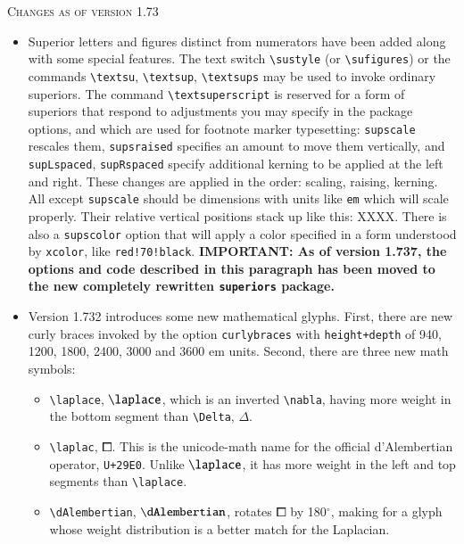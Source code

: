 \documentclass[\fsc]{article}
\theoremstyle{oldplain}
\theoremstyle{plain}
\begin{document}
\textsc{Changes as of version 1.73}
\begin{itemize}
\item
Superior letters and figures distinct from numerators have been added along with some special features. The text switch \verb|\sustyle| (or \verb|\sufigures|) or the commands \verb|\textsu|, \verb|\textsup|, \verb|\textsups| may be used to invoke ordinary superiors. 
The command \verb|\textsuperscript| is reserved for a form of superiors that respond to adjustments you may specify in the package options, and which are used for footnote marker typesetting: \verb|supscale| rescales them, \verb|supsraised| specifies an amount to move them vertically, and \verb|supLspaced|, \verb|supRspaced| specify additional kerning to be applied at the left and right. These changes are applied in the order: scaling, raising, kerning.  All except \verb|supscale| should be dimensions with units like {\tt em} which will scale properly. Their relative vertical positions stack up like this: XXXX.
 There is also a {\tt supscolor} option that will apply a color specified in a form understood by {\tt xcolor}, like {\tt red!70!black}. \textbf{IMPORTANT: As of version 1.737, the options and code described in this paragraph has been moved to the new completely rewritten  {\tt superiors} package.}
\item 
Version 1.732 introduces some new mathematical glyphs. First,  there are new curly braces invoked by the option {\tt curlybraces} with {\tt height+depth} of 940, 1200, 1800, 2400, 3000 and 3600 em units. Second, there are three new math symbols:
\begin{itemize}
\item
\verb|\laplace|, $\laplace$, which is an inverted \verb|\nabla|, having more weight in the  bottom segment than \verb|\Delta|, $\Delta$.
\item
\verb|\laplac|, $\laplac$. This is the unicode-math name for the official d'Alembertian operator, {\tt U+29E0}. Unlike  $\laplace$, it has more weight in the left and top segments than \verb|\laplace|.
\item \verb|\dAlembertian|, $\dAlembertian$, rotates $\laplac$ by 180${}^\circ$, making for a glyph whose weight distribution is a better match for the Laplacian.
\end{itemize}

\end{itemize}
\end{document}
